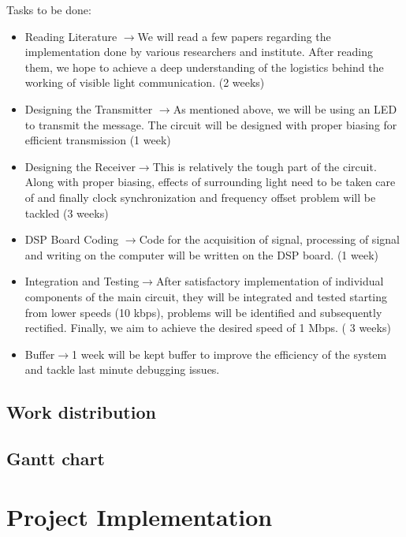\documentclass{article}
\newcommand{\ra}{$\rightarrow$}
\begin{document}
Tasks to be done:
\begin{itemize}
\item Reading Literature \ra We will read a few papers regarding the implementation done by various researchers and institute. After reading them, we hope to achieve a deep understanding of the logistics behind the working of visible light communication. (2 weeks)
\item Designing the Transmitter \ra As mentioned above, we will be using an LED to transmit the message. The circuit will be designed with proper biasing for efficient transmission (1 week)
\item Designing the Receiver\ra This is relatively the tough part of the circuit. Along with proper biasing, effects of surrounding light need to be taken care of and finally clock synchronization  and frequency offset problem will be tackled (3 weeks)
\item DSP Board Coding \ra  Code for the acquisition of signal, processing of signal and writing on the computer will be written on the DSP board. (1 week)
\item Integration and Testing\ra  After satisfactory implementation of individual components of the main circuit, they will be integrated and tested starting from lower speeds (10 kbps), problems will be identified and subsequently rectified. Finally, we aim to achieve the desired  speed of 1 Mbps. ( 3 weeks)
\item Buffer\ra  1 week will be kept buffer to improve the efficiency of the system and tackle last minute debugging issues.
\end{itemize}
\subsection{Work distribution}
\subsection{Gantt chart}

\section{Project Implementation}
\end{document}
